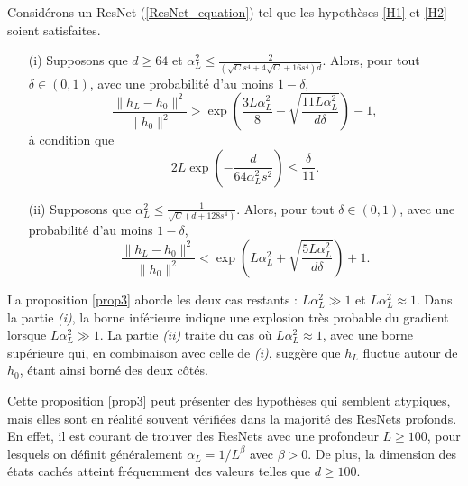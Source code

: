 \begin{proposition}[Admise]\label{prop3}
    Considérons un ResNet (\ref{ResNet_equation}) tel que les hypothèses \ref{H1} et \ref{H2} soient satisfaites.
    \begin{itemize}
        \item[(i)] Supposons que $ d \geq 64 $ et $ \alpha _L ^2 \leq  \frac{2 }{(\sqrt{C } s^4 + 4 \sqrt{C } + 16 s ^4)d} $. Alors, pour tout $ \delta \in (0, 1) $, avec une probabilité d'au moins $ 1 - \delta $,
        \[
            \frac{\|h_L - h_0\|^2}{\|h_0\|^2} > \exp\left(\frac{3L\alpha_L^2}{8} - \sqrt{\frac{11L\alpha_L^2}{d\delta}}\right) - 1,
        \]
        à condition que
        \[
            2L \exp\left(-\frac{d}{64\alpha_L^2s^2}\right) \leq \frac{\delta}{11}.
        \]
        \item[(ii)] Supposons que $ \alpha_L^2 \leq \frac{1}{\sqrt{C}(d + 128s^4)} $. Alors, pour tout $ \delta \in (0, 1)$, avec une probabilité d'au moins $1 - \delta $,
        \[
            \frac{\|h_L - h_0\|^2}{\|h_0\|^2} < \exp\left(L\alpha_L^2 + \sqrt{\frac{5L\alpha_L^2}{d\delta}}\right) + 1.
        \]
    \end{itemize}
\end{proposition}
La proposition \ref{prop3} aborde les deux cas restants : $L \alpha_L^2 \gg 1$ et $L \alpha_L^2 \approx 1$. Dans la partie \textit{(i)}, la borne inférieure indique une explosion très probable du gradient lorsque $L \alpha_L^2 \gg 1$. La partie \textit{(ii)} traite du cas où $L \alpha_L^2 \approx 1$, avec une borne supérieure qui, en combinaison avec celle de \textit{(i)}, suggère que $h_L$ fluctue autour de $h_0$, étant ainsi borné des deux côtés.

Cette proposition \ref{prop3} peut présenter des hypothèses qui semblent atypiques, mais elles sont en réalité souvent vérifiées dans la majorité des ResNets profonds. En effet, il est courant de trouver des ResNets avec une profondeur $L \geq 100$, pour lesquels on définit généralement $\alpha_L = 1 / L^\beta$ avec $\beta > 0$. De plus, la dimension des états cachés atteint fréquemment des valeurs telles que $d \geq 100$.

